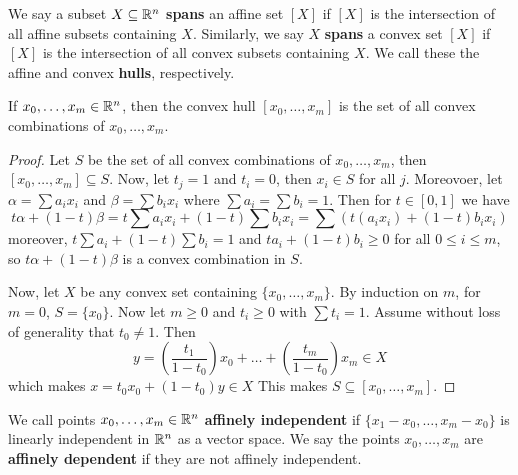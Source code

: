 \begin{definition}
    We say a subset $X \subseteq \mathbb{R}^n$  \textbf{spans} an affine set $[X]$ if
    $[X]$ is the intersection of all affine subsets containing $X$. Similarly,
    we say  $X$  \textbf{spans} a convex set $[X]$ if $[X]$ is the intersection
    of all convex subsets containing $X$. We call these the affine and convex
    \textbf{hulls}, respectively.
\end{definition}

\begin{theorem}\label{3.1.3}
    If $x_0, \dots, x_m \in \mathbb{R}^n$, then the convex hull $[x_0, \dots, x_m]$ is
    the set of all convex combinations of $x_0, \dots, x_m$.
\end{theorem}
\begin{proof}
    Let $S$ be the set of all convex combinations of  $x_0, \dots, x_m$, then
    $[x_0, \dots, x_m] \subseteq S$. Now, let $t_j=1$ and $t_i=0$, then  $x_i
    \in S$ for all  $j$. Moreovoer, let  $\alpha=\sum{a_ix_i}$ and
    $\beta=\sum{b_ix_i}$ where $\sum{a_i}=\sum{b_i}=1$. Then for $t \in [0,1]$
    we have
    \begin{equation*}
        t\alpha+(1-t)\beta=t\sum{a_ix_i}+(1-t)\sum{b_ix_i}=\sum{(t(a_ix_i)+(1-t)b_ix_i)}
    \end{equation*}
    moreover, $t\sum{a_i}+(1-t)\sum{b_i}=1$ and $ta_i+(1-t)b_i \geq 0$ for all
    $0 \leq i \leq m$, so  $t\alpha+(1-t)\beta$ is a convex combination in $S$.

    Now, let  $X$ be any convex set containing  $\{x_0, \dots, x_m\}$. By
    induction on $m$, for  $m=0$,  $S=\{x_0\}$. Now let $m \geq 0$ and  $t_i
    \geq 0$ with  $\sum{t_i}=1$. Assume without loss of generality that $t_0
    \neq 1$. Then
    \begin{equation*}
        y=(\frac{t_1}{1-t_0})x_0+\dots+(\frac{t_m}{1-t_0})x_m \in X
    \end{equation*}
    which makes $x=t_0x_0+(1-t_0)y \in X$ This makes $S \subseteq [x_0, \dots,
    x_m]$.
\end{proof}

\begin{definition}
    We call points $x_0, \dots, x_m \in \mathbb{R}^n$ \textbf{affinely independent} if
    $\{x_1-x_0, \dots, x_m-x_0\}$ is linearly independent in $\mathbb{R}^n$ as a vector
    space. We say the points $x_0 ,\dots, x_m$ are \textbf{affinely dependent}
    if they are not affinely independent.
\end{definition}

